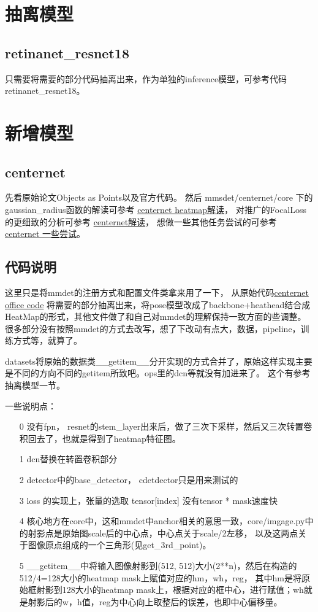 \documentclass[UTF8]{ctexart}
\begin{document}
\section{抽离模型}
\subsection{retinanet\_resnet18}
只需要将需要的部分代码抽离出来，作为单独的inference模型，可参考代码retinanet\_resnet18。

\section{新增模型}
\subsection{centernet}
先看原始论文Objects as Points以及官方代码。
然后
mmsdet/centernet/core 下的gaussian\_radius函数的解读可参考
\href{https://zhuanlan.zhihu.com/p/96856635}{centernet heatmap解读}，
对推广的FocalLoss的更细致的分析可参考
\href{https://zhuanlan.zhihu.com/p/66048276}{centernet解读}，
想做一些其他任务尝试的可参考
\href{https://zhuanlan.zhihu.com/p/76378871}{centernet 一些尝试}。

\subsection{代码说明}
这里只是将mmdet的注册方式和配置文件类拿来用了一下，
从原始代码\href{https://github.com/xingyizhou/CenterNet}{centernet office code}
将需要的部分抽离出来，将pose模型改成了backbone+heathead结合成HeatMap的形式，其他文件做了和自己对mmdet的理解保持一致方面的些调整。
很多部分没有按照mmdet的方式去改写，想了下改动有点大，数据，pipeline，训练方式等，就算了。

datasets将原始的数据类\_\_getitem\_\_分开实现的方式合并了，原始这样实现主要是不同的方向不同的getitem所致吧。ops里的dcn等就没有加进来了。
这个有参考抽离模型一节。

一些说明点：
\begin{itemize}
	\item[0] 没有fpn， resnet的stem\_layer出来后，做了三次下采样，然后又三次转置卷积回去了，也就是得到了heatmap特征图。
	\item[1] dcn替换在转置卷积部分
	\item[2] detector中的base\_detector， cdetdector只是用来测试的
	\item[3] loss 的实现上，张量的选取 tensor[index] 没有tensor * mask速度快
	\item[4] 核心地方在core中，这和mmdet中anchor相关的意思一致，core/imgage.py中的射影点是原始图scale后的中心点，中心点关于scale/2左移，
	以及这两点关于图像原点组成的一个三角形(见get\_3rd\_point)。
	\item[5] \_\_getitem\_\_中将输入图像射影到(512, 512)大小(2**n)，然后在构造的512/4=128大小的heatmap mask上赋值对应的hm，wh，reg，
	其中hm是将原始框射影到128大小的heatmap mask上，根据对应的框中心，进行赋值；wh就是射影后的w，h值，reg为中心向上取整后的误差，也即中心偏移量。
\end{itemize}
\end{document}
